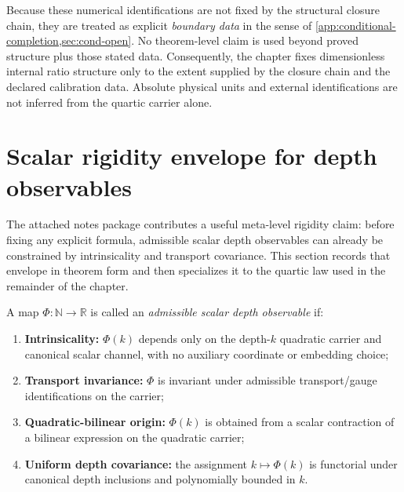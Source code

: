 Because these numerical identifications are not fixed by the structural
closure chain, they are treated as explicit \emph{boundary data} in the
sense of \cref{app:conditional-completion,sec:cond-open}.
No theorem-level claim is used beyond proved structure plus those stated
data.
Consequently, the chapter fixes dimensionless internal ratio structure
only to the extent supplied by the closure chain and the declared
calibration data.  Absolute physical units and external identifications
are not inferred from the quartic carrier alone.

\section{Scalar rigidity envelope for depth observables}
\label{sec:numbers-rigidity-envelope}

The attached notes package contributes a useful meta-level rigidity claim:
before fixing any explicit formula, admissible scalar depth observables
can already be constrained by intrinsicality and transport covariance.
This section records that envelope in theorem form and then specializes
it to the quartic law used in the remainder of the chapter.

\begin{definition}
\label{def:numbers-admissible-depth-observable}
A map \(\Phi:\mathbb N\to\mathbb R\) is called an
\emph{admissible scalar depth observable} if:
\begin{enumerate}[label=\textup{(\roman*)}]
\item
      \textbf{Intrinsicality:} \(\Phi(k)\) depends only on the depth-\(k\)
      quadratic carrier and canonical scalar channel, with no auxiliary
      coordinate or embedding choice;
\item
      \textbf{Transport invariance:} \(\Phi\) is invariant under admissible
      transport/gauge identifications on the carrier;
\item
      \textbf{Quadratic-bilinear origin:} \(\Phi(k)\) is obtained from a
      scalar contraction of a bilinear expression on the quadratic carrier;
\item
      \textbf{Uniform depth covariance:} the assignment
      \(k\mapsto\Phi(k)\) is functorial under canonical depth inclusions and
      polynomially bounded in \(k\).
\end{enumerate}
\end{definition}

